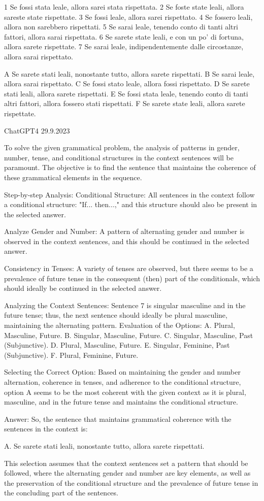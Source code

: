 1 Se fossi stata leale, allora sarei stata rispettata.
2 Se foste state leali, allora sareste state rispettate.
3 Se fossi leale, allora sarei rispettato.
4 Se fossero leali, allora non sarebbero rispettati.
5 Se sarai leale, tenendo conto di tanti altri fattori, allora sarai rispettata.
6 Se sarete state leali, e con un po' di fortuna, allora sarete rispettate.
7 Se sarai leale, indipendentemente dalle circostanze, allora sarai rispettato.

A Se sarete stati leali, nonostante tutto, allora sarete rispettati.
B Se sarai leale, allora sarai rispettato.
C Se fossi stato leale, allora fossi rispettato.
D Se sarete stati leali, allora sarete rispettati.
E Se fossi stata leale, tenendo conto di tanti altri fattori, allora fossero stati rispettati.
F Se sarete state leali, allora sarete rispettate.

ChatGPT4 29.9.2023

To solve the given grammatical problem, the analysis of patterns in gender, number, tense, and conditional structures in the context sentences will be paramount. The objective is to find the sentence that maintains the coherence of these grammatical elements in the sequence.

Step-by-step Analysis:
Conditional Structure: All sentences in the context follow a conditional structure: "If... then...," and this structure should also be present in the selected answer.

Analyze Gender and Number: A pattern of alternating gender and number is observed in the context sentences, and this should be continued in the selected answer.

Consistency in Tenses: A variety of tenses are observed, but there seems to be a prevalence of future tense in the consequent (then) part of the conditionals, which should ideally be continued in the selected answer.

Analyzing the Context Sentences:
Sentence 7 is singular masculine and in the future tense; thus, the next sentence should ideally be plural masculine, maintaining the alternating pattern.
Evaluation of the Options:
A. Plural, Masculine, Future.
B. Singular, Masculine, Future.
C. Singular, Masculine, Past (Subjunctive).
D. Plural, Masculine, Future.
E. Singular, Feminine, Past (Subjunctive).
F. Plural, Feminine, Future.

Selecting the Correct Option:
Based on maintaining the gender and number alternation, coherence in tenses, and adherence to the conditional structure, option A seems to be the most coherent with the given context as it is plural, masculine, and in the future tense and maintains the conditional structure.

Answer:
So, the sentence that maintains grammatical coherence with the sentences in the context is:

A. Se sarete stati leali, nonostante tutto, allora sarete rispettati.

This selection assumes that the context sentences set a pattern that should be followed, where the alternating gender and number are key elements, as well as the preservation of the conditional structure and the prevalence of future tense in the concluding part of the sentences.


